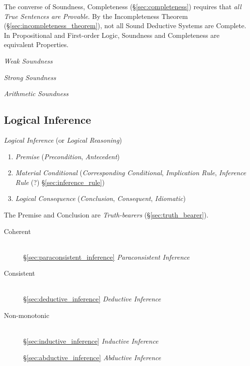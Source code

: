 The converse of Soundness, Completeness (\S\ref{sec:completeness}) requires
that \emph{all True Sentences are Provable}. By the Incompleteness Theorem
(\S\ref{sec:incompleteness_theorem}), not all Sound Deductive Systems are
Complete. In Propositional and First-order Logic, Soundness and Completeness
are equivalent Properties.

\emph{Weak Soundness}

\emph{Strong Soundness}

\emph{Arithmetic Soundness}



\subsection{Logical Inference}\label{sec:logical_inference}

\emph{Logical Inference} (or \emph{Logical Reasoning})

\begin{enumerate}
\item \emph{Premise} (\emph{Precondition}, \emph{Antecedent})

\item \emph{Material Conditional} (\emph{Corresponding Conditional},
  \emph{Implication Rule}, \emph{Inference Rule} (?)
  \S\ref{sec:inference_rule})

\item \emph{Logical Consequence} (\emph{Conclusion},
  \emph{Consequent}, \emph{Idiomatic})
\end{enumerate}

The Premise and Conclusion are \emph{Truth-bearers}
(\S\ref{sec:truth_bearer}).

\begin{description}
\item [Coherent] \hfill\\
  \S\ref{sec:paraconsistent_inference}
  \emph{Paraconsistent Inference}

\item [Consistent] \hfill\\
  \S\ref{sec:deductive_inference} \emph{Deductive Inference}

\item [Non-monotonic] \hfill\\
  \S\ref{sec:inductive_inference} \emph{Inductive Inference}

  \S\ref{sec:abductive_inference} \emph{Abductive Inference}

\end{description}


